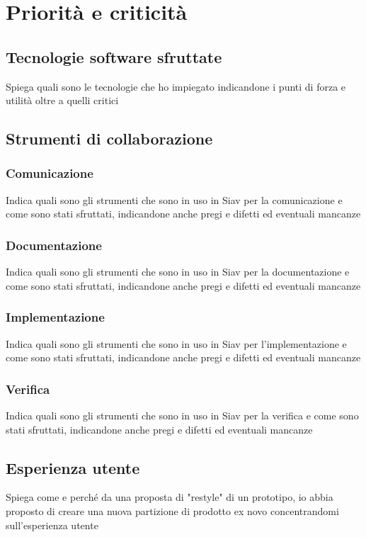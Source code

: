 \section{Priorità e criticità}

\subsection{Tecnologie software sfruttate}
Spiega quali sono le tecnologie che ho impiegato indicandone i punti di forza e utilità oltre a quelli critici
\subsection{Strumenti di collaborazione}
\subsubsection{Comunicazione}
Indica quali sono gli strumenti che sono in uso in Siav per la comunicazione e come sono stati sfruttati, indicandone anche pregi e difetti ed eventuali mancanze
\subsubsection{Documentazione}
Indica quali sono gli strumenti che sono in uso in Siav per la documentazione e come sono stati sfruttati, indicandone anche pregi e difetti ed eventuali mancanze
\subsubsection{Implementazione}
Indica quali sono gli strumenti che sono in uso in Siav per l'implementazione e come sono stati sfruttati, indicandone anche pregi e difetti ed eventuali mancanze
\subsubsection{Verifica}
Indica quali sono gli strumenti che sono in uso in Siav per la verifica e come sono stati sfruttati, indicandone anche pregi e difetti ed eventuali mancanze
\subsection{Esperienza utente}
Spiega come e perché da una proposta di "restyle" di un prototipo, io abbia proposto di creare una nuova partizione di prodotto ex novo concentrandomi sull'esperienza utente

